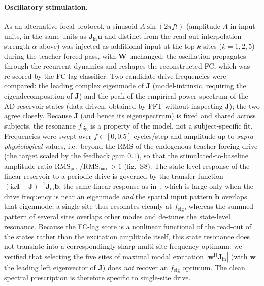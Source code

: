 \documentclass[11pt]{article}
\begin{document}
\paragraph{Oscillatory stimulation.}
As an alternative focal protocol, a sinusoid $A\sin(2\pi f t)$ (amplitude $A$ in
input units, in the same units as $\mathbf{J}_{\mathrm{in}}\mathbf{u}$ and
distinct from the read-out interpolation strength $\alpha$ above) was injected as
additional input at the top-$k$ sites ($k=1,2,5$) during the teacher-forced
pass, with $\mathbf{W}$ unchanged; the oscillation propagates through the
recurrent dynamics and reshapes the reconstructed FC, which was re-scored by the
FC-lag classifier. Two candidate drive frequencies were compared: the leading
complex eigenmode of $\mathbf{J}$ (model-intrinsic, requiring the eigendecomposition
of $\mathbf{J}$) and the peak of the empirical power spectrum of the AD reservoir
states (data-driven, obtained by FFT without inspecting $\mathbf{J}$); the two
agree closely. Because $\mathbf{J}$ (and hence its eigenspectrum) is fixed and
shared across subjects, the resonance $f_{\mathrm{eig}}$ is a property of the model,
not a subject-specific fit. Frequencies were swept over $f\in[0,0.5]$ cycles/step
and amplitude up to \emph{supra-physiological} values, i.e.\ beyond the RMS of
the endogenous teacher-forcing drive (the target scaled by the feedback gain
$0.1$), so that the stimulated-to-baseline amplitude ratio
$\mathrm{RMS}_{\mathrm{pert}}/\mathrm{RMS}_{\mathrm{base}}>1$ (fig.~S8).
The state-level response of the linear
reservoir to a periodic drive is governed by the transfer function
$(\mathrm{i}\omega\mathbf{I}-\mathbf{J})^{-1}\mathbf{J}_{\mathrm{in}}\mathbf{b}$,
the same linear response as in~\cite{diantonio2026},
which is large only when the drive frequency is near an eigenmode \emph{and} the
spatial input pattern $\mathbf{b}$ overlaps that eigenmode; a single site thus
resonates cleanly at $f_{\mathrm{eig}}$, whereas the summed pattern of several
sites overlaps other modes and de-tunes the state-level resonance. Because the
FC-lag score is a nonlinear functional of the read-out of the states rather than
the excitation amplitude itself, this state resonance does not translate into a
correspondingly sharp multi-site frequency optimum: we verified that selecting
the five sites of maximal modal excitation
$|\mathbf{w}^{\mathsf H}\mathbf{J}_{\mathrm{in}}|$ (with $\mathbf{w}$ the leading
left eigenvector of $\mathbf{J}$) does \emph{not} recover an $f_{\mathrm{eig}}$
optimum. The clean spectral prescription is therefore specific to single-site
drive.
\end{document}
